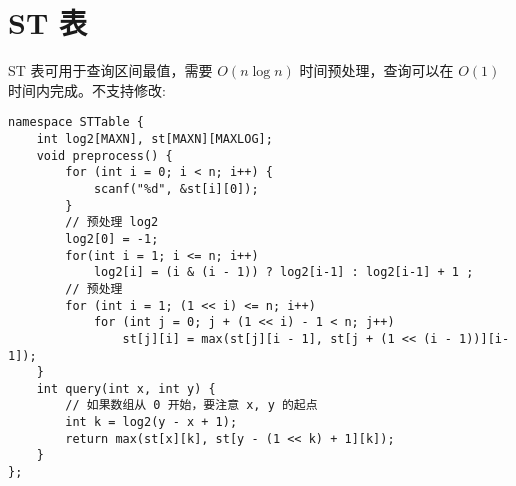 \section{ST 表}
\par \noindent ST 表可用于查询区间最值，需要 $O(n\log n)$ 时间预处理，查询可以在 $O(1)$ 时间内完成。不支持修改:
\begin{verbatim}
namespace STTable {
    int log2[MAXN], st[MAXN][MAXLOG];
    void preprocess() {
        for (int i = 0; i < n; i++) {
            scanf("%d", &st[i][0]);
        }
        // 预处理 log2
        log2[0] = -1;
        for(int i = 1; i <= n; i++)
            log2[i] = (i & (i - 1)) ? log2[i-1] : log2[i-1] + 1 ;    
        // 预处理
        for (int i = 1; (1 << i) <= n; i++)
            for (int j = 0; j + (1 << i) - 1 < n; j++)
                st[j][i] = max(st[j][i - 1], st[j + (1 << (i - 1))][i-1]);
    }
    int query(int x, int y) {
        // 如果数组从 0 开始，要注意 x, y 的起点
        int k = log2(y - x + 1);
        return max(st[x][k], st[y - (1 << k) + 1][k]);
    }
};
\end{verbatim}